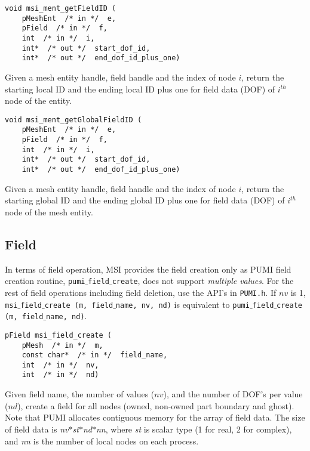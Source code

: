 \begin{verbatim}
void msi_ment_getFieldID (
    pMeshEnt  /* in */  e, 
    pField  /* in */  f, 
    int  /* in */  i,
    int*  /* out */  start_dof_id, 
    int*  /* out */  end_dof_id_plus_one)
\end{verbatim}\vspace{-.5cm}\hspace{1cm}
Given a mesh entity handle, field handle and the index of node $i$, return the starting local ID and the ending local ID plus one for field data (DOF) of $i^{th}$ node of the entity. 

\begin{verbatim}
void msi_ment_getGlobalFieldID (
    pMeshEnt  /* in */  e, 
    pField  /* in */  f, 
    int  /* in */  i,
    int*  /* out */  start_dof_id, 
    int*  /* out */  end_dof_id_plus_one)
\end{verbatim}\vspace{-.5cm}\hspace{1cm}
Given a mesh entity handle, field handle and the index of node $i$, return the starting global ID and the ending global ID plus one for field data (DOF) of $i^{th}$ node of the mesh entity. 

\subsection{Field}

In terms of field operation, MSI provides the field creation only as PUMI field creation routine, \texttt{pumi$\_$field$\_$create}, does not support \textit{multiple values}. For the rest of field operations including field deletion, use the API's in \texttt{PUMI.h}. If $nv$ is 1, \texttt{msi$\_$field$\_$create (m, field$\_$name, nv, nd)} is equivalent to \texttt{pumi$\_$field$\_$create (m, field$\_$name, nd)}.

\begin{verbatim}
pField msi_field_create (
    pMesh  /* in */  m,
    const char*  /* in */  field_name, 
    int  /* in */  nv, 
    int  /* in */  nd)
\end{verbatim}\vspace{-.5cm}\hspace{1cm}
Given field name, the number of values ($nv$), and the number of DOF's per value ($nd$), create a field for all nodes (owned, non-owned part boundary and ghost). Note that PUMI allocates contiguous memory for the array of field data. The size of field data is \textit{nv}$*$\textit{st}$*$\textit{nd}$*$\textit{nn}, where \textit{st} is scalar type (1 for real, 2 for complex), and \textit{nn} is the number of local nodes on each process.


